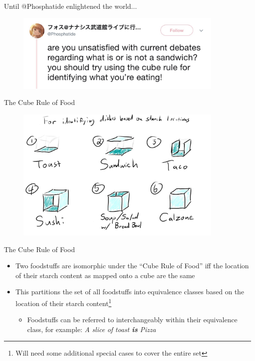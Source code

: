 \documentclass{beamer}
\begin{document}
\begin{frame}{Until @Phosphatide enlightened the world...}
    \begin{figure}
        \includegraphics[width=0.9\textwidth]{phosphatide.jpg}
        \label{fig:phosphatide}
    \end{figure}
\end{frame}

\begin{frame}{The Cube Rule of Food}
    \begin{figure}
        \includegraphics[width=0.9\textwidth]{cube_rule_of_food.jpg}
        \label{fig:cube-rule-of-food}
    \end{figure}
\end{frame}

\begin{frame}{The Cube Rule of Food}
    \begin{itemize}
        \item Two foodstuffs are isomorphic under the ``Cube Rule of Food'' iff the location of their starch content as mapped onto a cube are the same
        \vskip 0.5cm
        \item This partitions the set of all foodstuffs into equivalence classes based on the location of their starch content\footnote{Will need some additional special cases to cover the entire set}
        \begin{itemize}
            \item Foodstuffs can be referred to interchangeably within their equivalence class, for example: \textit{A slice of toast \textbf{is} Pizza}
        \end{itemize}
    \end{itemize}
\end{frame}
\end{document}
